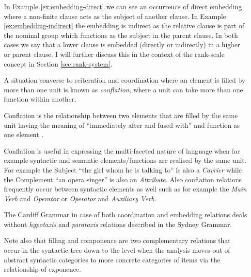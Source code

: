     In Example \ref{ex:embedding-direct} we can see an occurrence of direct embedding where a non-finite clause acts as the subject of another clause. In Example \ref{ex:embedding-indirect} the embedding is indirect as the relative clause is part of the nominal group which functions as the subject in the parent clause. In both cases we say that a lower clause is embedded (directly or indirectly) in a higher or parent clause. I will further discuss this in the context of the rank-scale concept in Section \ref{sec:rank-system}.
    
    A situation converse to reiteration and coordination where an element is filled by more than one unit is known as \textit{conflation}, where a unit can take more than one function within another. 
    
    \begin{definition}[Conflation]\label{def:conflation}
        Conflation is the relationship between two elements that are filled by the same unit having the meaning of ``immediately after and fused with'' and function as one element \citep[249--250]{Fawcett2000}. 
    \end{definition}
    
    Conflation is useful in expressing the multi-faceted nature of language when for example syntactic and semantic elements/functions are realised by the same unit. For example the Subject ``the girl whom he is talking to'' is also a \textit{Carrier} while the Complement ``an opera singer'' is also an \textit{Attribute}. Also conflation relations frequently occur between syntactic elements as well such as for example the \textit{Main Verb} and \textit{Operator} or \textit{Operator} and \textit{Auxiliary Verb}.
    
    The Cardiff Grammar in case of both coordination and embedding relations deals without \textit{hypotaxis} and \textit{parataxis} relations described in the Sydney Grammar.
    
    Note also that filling and componence are two complementary relations that occur in the syntactic tree down to the level when the analysis moves out of abstract syntactic categories to more concrete categories of items via the relationship of exponence.
    

